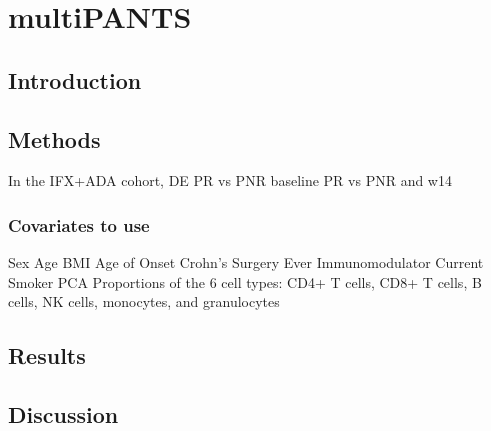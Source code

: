 %
%

\chapter{multiPANTS}

\section{Introduction}

\section{Methods}

In the IFX+ADA cohort, 
    DE
    PR vs PNR baseline
    PR vs PNR and w14

\subsection{Covariates to use}

Sex
Age
BMI
Age of Onset
Crohn’s Surgery
Ever Immunomodulator
Current Smoker
PCA
Proportions of the 6 cell types: CD4+ T cells, CD8+ T cells, B cells, NK cells, monocytes, and granulocytes

\section{Results}

\section{Discussion}


